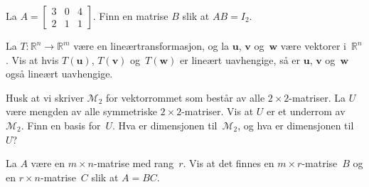 \documentclass[titlepage,a4paper,12pt,norsk]{IMFeksamen}
\newcommand{\R}{\mathbb{R}}
\newcommand{\M}{\mathcal{M}} %
\newcommand{\V}[1]{\mathbf{#1}}
\renewcommand{\u}{\V{u}}
\renewcommand{\v}{\V{v}}
\newcommand{\w}{\V{w}}
\newcommand{\0}{\V{0}}
\begin{document}
\begin{oppgave}
La %
$
A =
\begin{bmatrix}
3 & 0 & 4 \\
2 & 1 & 1
\end{bmatrix}
$.
Finn en matrise $B$ slik at $AB = I_2$.
\end{oppgave}


\begin{oppgave}
La $T \colon \R^n \to \R^m$ være en lineærtransformasjon, og la $\u$,
$\v$ og~$\w$ være vektorer i~$\R^n$.  Vis at hvis $T(\u)$, $T(\v)$
og~$T(\w)$ er lineært uavhengige, så er $\u$, $\v$ og~$\w$ også
lineært uavhengige.
\end{oppgave}


\begin{oppgave}
Husk at vi skriver $\M_2$ for vektorrommet som består av alle $2 \times 2$-matriser.
La $U$ være mengden av alle symmetriske $2 \times 2$-matriser.
Vis at $U$ er et underrom av~$\M_2$.
Finn en basis for~$U$.  Hva er dimensjonen til~$\M_2$, og hva er dimensjonen til~$U$?
\end{oppgave}


\begin{oppgave}
La $A$ være en $m \times n$-matrise med rang~$r$.
Vis at det finnes en $m \times r$-matrise~$B$ og
en $r \times n$-matrise~$C$
slik at $A = BC$.
\end{oppgave}
\end{document}
